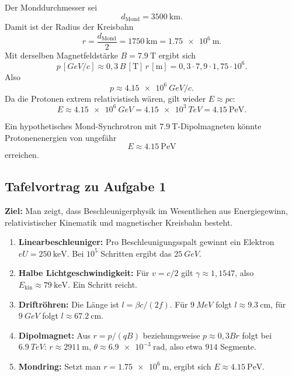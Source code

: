 \documentclass[11pt,a4paper]{scrartcl}
\newcommand{\MeV}{\si{MeV}}
\newcommand{\GeV}{\si{GeV}}
\newcommand{\TeV}{\si{TeV}}
\theoremstyle{definition}
\theoremstyle{plain}
\theoremstyle{remark}
\begin{document}
\begin{calculationbox}
Der Monddurchmesser sei
\[
    d_{\mathrm{Mond}}=\SI{3500}{\kilo\metre}.
\]
Damit ist der Radius der Kreisbahn
\[
    r = \frac{d_{\mathrm{Mond}}}{2}
    = \SI{1750}{\kilo\metre}
    = \SI{1,75e6}{\metre}.
\]
Mit derselben Magnetfeldstärke \(B=\SI{7,9}{\tesla}\) ergibt sich
\[
    p\,[\si{\GeV}/c]
    \approx 0{,}3\,B\,[\si{\tesla}]\,r\,[\si{\metre}]
    = 0{,}3\cdot 7{,}9\cdot 1{,}75\cdot 10^6.
\]
Also
\[
    p \approx \SI{4,15e6}{\GeV}/c.
\]
Da die Protonen extrem relativistisch wären, gilt wieder \(E\approx pc\):
\[
    E \approx \SI{4,15e6}{\GeV}
    = \SI{4,15e3}{\TeV}
    = \SI{4,15}{\peta\electronvolt}.
\]
\end{calculationbox}

\begin{answerbox}
Ein hypothetisches Mond-Synchrotron mit \(\SI{7,9}{\tesla}\)-Dipolmagneten könnte Protonenenergien von ungefähr
\[
    \boxed{E\approx \SI{4,15}{\peta\electronvolt}}
\]
erreichen.
\end{answerbox}

\subsection{Tafelvortrag zu Aufgabe 1}

\begin{presentationbox}
\textbf{Ziel:} Man zeigt, dass Beschleunigerphysik im Wesentlichen aus Energiegewinn, relativistischer Kinematik und magnetischer Kreisbahn besteht.

\begin{enumerate}[label=\arabic*.]
    \item \textbf{Linearbeschleuniger:} Pro Beschleunigungsspalt gewinnt ein Elektron \(eU=\SI{250}{\kilo\electronvolt}\). Bei \(10^5\) Schritten ergibt das \(\SI{25}{\GeV}\).
    \item \textbf{Halbe Lichtgeschwindigkeit:} Für \(v=c/2\) gilt \(\gamma\approx1{,}1547\), also \(E_{\mathrm{kin}}\approx\SI{79}{\kilo\electronvolt}\). Ein Schritt reicht.
    \item \textbf{Driftröhren:} Die Länge ist \(l=\beta c/(2f)\). Für \(\SI{9}{\MeV}\) folgt \(l\approx\SI{9,3}{\centi\metre}\), für \(\SI{9}{\GeV}\) folgt \(l\approx\SI{67,2}{\centi\metre}\).
    \item \textbf{Dipolmagnet:} Aus \(r=p/(qB)\) beziehungsweise \(p\approx0{,}3Br\) folgt bei \(\SI{6,9}{\TeV}\): \(r\approx\SI{2911}{\metre}\), \(\theta\approx\SI{6,9e-3}{\radian}\), also etwa \(914\) Segmente.
    \item \textbf{Mondring:} Setzt man \(r=\SI{1,75e6}{\metre}\), ergibt sich \(E\approx\SI{4,15}{\peta\electronvolt}\).
\end{enumerate}
\end{presentationbox}
\end{document}
